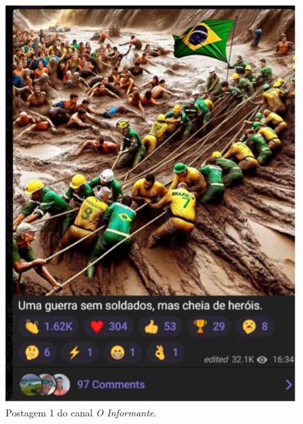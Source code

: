 \documentclass[portuguese]{textolivre}
\begin{document}
\begin{figure}[h!]
    \centering
    \begin{minipage}[t]{0.31\textwidth}
        \centering
        \includegraphics[width=\linewidth]{Imagens/Fig38.png}
        \caption{Postagem 1 do canal \emph{O Informante}.}
        \label{fig-13}
    \end{minipage}
    \hfill
    \begin{minipage}[t]{0.38\textwidth}
        \centering

\end{minipage}
\end{figure}
\end{document}
